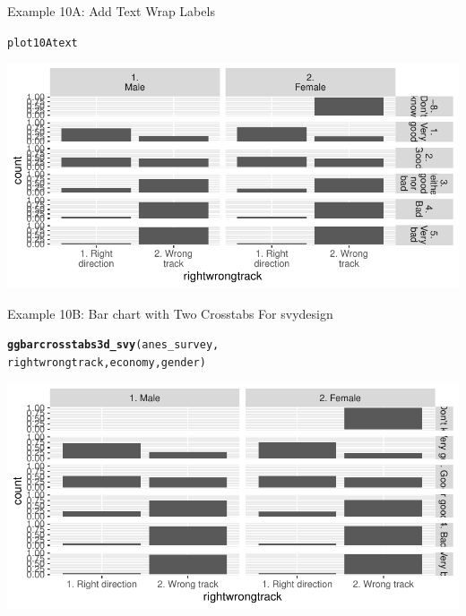 \documentclass{beamer}\usepackage[]{graphicx}\usepackage[]{xcolor}
\makeatletter
\newcommand{\hlstd}[1]{\textcolor[rgb]{0.345,0.345,0.345}{#1}}%
\newcommand{\hlkwd}[1]{\textcolor[rgb]{0.737,0.353,0.396}{\textbf{#1}}}%
\newenvironment{kframe}{%
 \def\at@end@of@kframe{}%
 \ifinner\ifhmode%
  \def\at@end@of@kframe{\end{minipage}}%
  \begin{minipage}{\columnwidth}%
 \fi\fi%
 \def\FrameCommand##1{\hskip\@totalleftmargin \hskip-\fboxsep
 \colorbox{shadecolor}{##1}\hskip-\fboxsep
     \hskip-\linewidth \hskip-\@totalleftmargin \hskip\columnwidth}%
 \MakeFramed {\advance\hsize-\width
   \@totalleftmargin\z@ \linewidth\hsize
   \@setminipage}}%
 {\par\unskip\endMakeFramed%
 \at@end@of@kframe}
\newenvironment{knitrout}{}{} %
\makeatother
\begin{document}
\begin{frame}[fragile]{Example 10A: Add Text Wrap Labels}

\begin{knitrout}
\color{fgcolor}\begin{kframe}
\begin{alltt}
\hlstd{plot10Atext}
\end{alltt}
\end{kframe}
\includegraphics[width=0.95\linewidth]{figure/unnamed-chunk-60-1} 
\end{knitrout}
\end{frame}




\begin{frame}[fragile]{Example 10B: Bar chart with Two Crosstabs For svydesign}

\begin{knitrout}
\color{fgcolor}\begin{kframe}
\begin{alltt}
\hlkwd{ggbarcrosstabs3d_svy}\hlstd{(anes_survey,}
    \hlstd{rightwrongtrack, economy, gender)}
\end{alltt}
\end{kframe}
\includegraphics[width=0.95\linewidth]{figure/unnamed-chunk-61-1} 
\end{knitrout}
\end{frame}
\end{document}
